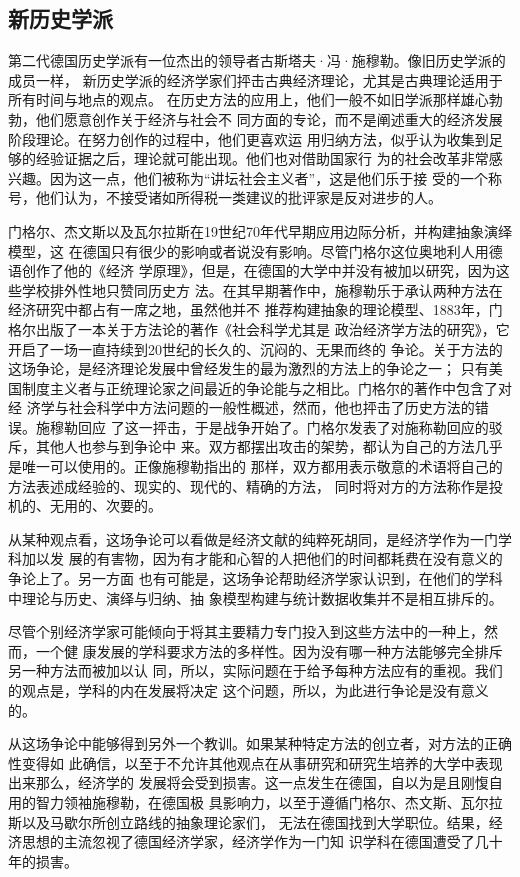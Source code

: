 \subsection{新历史学派}

第二代德国历史学派有一位杰出的领导者古斯塔夫·冯·施穆勒。像旧历史学派的成员一样，
新历史学派的经济学家们抨击古典经济理论，尤其是古典理论适用于所有时间与地点的观点。
在历史方法的应用上，他们一般不如旧学派那样雄心勃勃，他们愿意创作关于经济与社会不
同方面的专论，而不是阐述重大的经济发展阶段理论。在努力创作的过程中，他们更喜欢运
用归纳方法，似乎认为收集到足够的经验证据之后，理论就可能出现。他们也对借助国家行
为的社会改革非常感兴趣。因为这一点，他们被称为“讲坛社会主义者”，这是他们乐于接
受的一个称号，他们认为，不接受诸如所得税一类建议的批评家是反对进步的人。

门格尔、杰文斯以及瓦尔拉斯在19世纪70年代早期应用边际分析，并构建抽象演绎模型，这
在德国只有很少的影响或者说没有影响。尽管门格尔这位奥地利人用德语创作了他的《经济
学原理》，但是，在德国的大学中并没有被加以研究，因为这些学校排外性地只赞同历史方
法。在其早期著作中，施穆勒乐于承认两种方法在经济研究中都占有一席之地，虽然他并不
推荐构建抽象的理论模型、1883年，门格尔出版了一本关于方法论的著作《社会科学尤其是
政治经济学方法的研究》，它开启了一场一直持续到20世纪的长久的、沉闷的、无果而终的
争论。关于方法的这场争论，是经济理论发展中曾经发生的最为激烈的方法上的争论之一；
只有美国制度主义者与正统理论家之间最近的争论能与之相比。门格尔的著作中包含了对经
济学与社会科学中方法问题的一般性概述，然而，他也抨击了历史方法的错误。施穆勒回应
了这一抨击，于是战争开始了。门格尔发表了对施称勒回应的驳斥，其他人也参与到争论中
来。双方都摆出攻击的架势，都认为自己的方法几乎是唯一可以使用的。正像施穆勒指出的
那样，双方都用表示敬意的术语将自己的方法表述成经验的、现实的、现代的、精确的方法，
同时将对方的方法称作是投机的、无用的、次要的。

从某种观点看，这场争论可以看做是经济文献的纯粹死胡同，是经济学作为一门学科加以发
展的有害物，因为有才能和心智的人把他们的时间都耗费在没有意义的争论上了。另一方面
也有可能是，这场争论帮助经济学家认识到，在他们的学科中理论与历史、演绎与归纳、抽
象模型构建与统计数据收集并不是相互排斥的。

尽管个别经济学家可能倾向于将其主要精力专门投入到这些方法中的一种上，然而，一个健
康发展的学科要求方法的多样性。因为没有哪一种方法能够完全排斥另一种方法而被加以认
同，所以，实际问题在于给予每种方法应有的重视。我们的观点是，学科的内在发展将决定
这个问题，所以，为此进行争论是没有意义的。

从这场争论中能够得到另外一个教训。如果某种特定方法的创立者，对方法的正确性变得如
此确信，以至于不允许其他观点在从事研究和研究生培养的大学中表现出来那么，经济学的
发展将会受到损害。这一点发生在德国，自以为是且刚愎自用的智力领袖施穆勒，在德国极
具影响力，以至于遵循门格尔、杰文斯、瓦尔拉斯以及马歇尔所创立路线的抽象理论家们，
无法在德国找到大学职位。结果，经济思想的主流忽视了德国经济学家，经济学作为一门知
识学科在德国遭受了几十年的损害。

